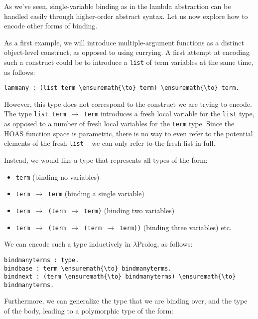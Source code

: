 As we've seen, single-variable binding as in the lambda abstraction can
be handled easily through higher-order abstract syntax. Let us now
explore how to encode other forms of binding.

As a first example, we will introduce multiple-argument functions as a
distinct object-level construct, as opposed to using currying. A first
attempt at encoding such a construct could be to introduce a
\texttt{list} of term variables at the same time, as follows:

\begin{verbatim}
lammany : (list term \ensuremath{\to} term) \ensuremath{\to} term.
\end{verbatim}

However, this type does not correspond to the construct we are trying to
encode. The type \texttt{list\ term\ \ensuremath{\to}\ term} introduces a
fresh local variable for the \texttt{list} type, as opposed to a number
of fresh local variables for the \texttt{term} type. Since the HOAS
function space is parametric, there is no way to even refer to the
potential elements of the fresh \texttt{list} -- we can only refer to
the fresh list in full.

Instead, we would like a type that represents all types of the form:

\begin{itemize}
\itemsep1pt\parskip0pt
\item
  \texttt{term} (binding no variables)
\item
  \texttt{term\ \ensuremath{\to}\ term} (binding a single variable)
\item
  \texttt{term\ \ensuremath{\to}\ (term\ \ensuremath{\to}\ term)} (binding
  two variables)
\item
  \texttt{term\ \ensuremath{\to}\ (term\ \ensuremath{\to}\ (term\ \ensuremath{\to}\ term))}
  (binding three variables) etc.
\end{itemize}

We can encode such a type inductively in \ensuremath{\lambda}Prolog, as follows:

\begin{verbatim}
bindmanyterms : type.
bindbase : term \ensuremath{\to} bindmanyterms.
bindnext : (term \ensuremath{\to} bindmanyterms) \ensuremath{\to} bindmanyterms.
\end{verbatim}

Furthermore, we can generalize the type that we are binding over, and
the type of the body, leading to a polymorphic type of the form:


